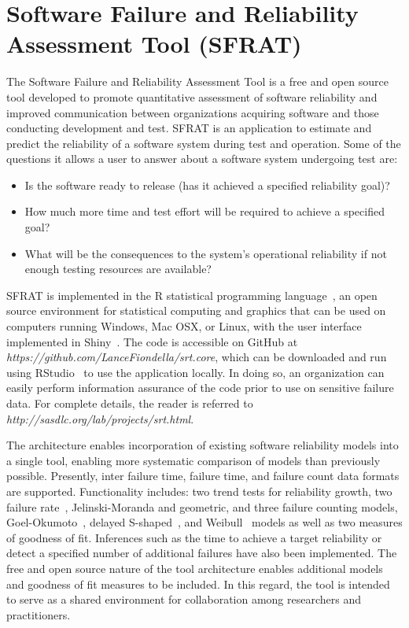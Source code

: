 \documentclass[journal]{IEEEtran}
\begin{document}
\section{Software Failure and Reliability Assessment Tool (SFRAT)}\label{sec:SFRAT}
The Software Failure and Reliability Assessment Tool is a free and open source tool developed to promote quantitative assessment of software reliability and improved communication between organizations acquiring software and those conducting development and test. SFRAT is an application to estimate and predict the reliability of a software system during test and operation. Some of the questions it allows a user to answer about a software system undergoing test are:
\begin{itemize}
\item {Is the software ready to release (has it achieved a specified reliability goal)?}
\item {How much more time and test effort will be required to achieve a specified goal?}
\item {What will be the consequences to the system’s operational reliability if not enough testing resources are available?}
\end{itemize}

SFRAT is implemented in the R statistical programming language~\cite{}, an open source environment for statistical computing and graphics that can be used on computers running Windows, Mac OSX, or Linux, with the user interface implemented in Shiny~\cite{}. The code is accessible on GitHub at \textit{https://github.com/LanceFiondella/srt.core}, which can be downloaded and run using RStudio~\cite{} to use the application locally. In doing so, an organization can easily perform information assurance of the code prior to use on sensitive failure data. For complete details, the reader is referred to \textit{http://sasdlc.org/lab/projects/srt.html}.

The architecture enables incorporation of existing software reliability models into a single tool, enabling more systematic comparison of models than previously possible. Presently, inter failure time, failure time, and failure count data formats are supported. Functionality includes: two trend tests for reliability growth, two failure rate~\cite{BookHoSRE}, Jelinski-Moranda and geometric, and three failure counting models, Goel-Okumoto~\cite{goel1985software}, delayed S-shaped~\cite{artTR1986_19}, and Weibull~\cite{artNHPPsurvey} models as well as two measures of goodness of fit. Inferences such as the time to achieve a target reliability or detect a specified number of additional failures have also been implemented. The free and open source nature of the tool architecture enables additional models and goodness of fit measures to be included. In this regard, the tool is intended to serve as a shared environment for collaboration among researchers and practitioners.
\end{document}
